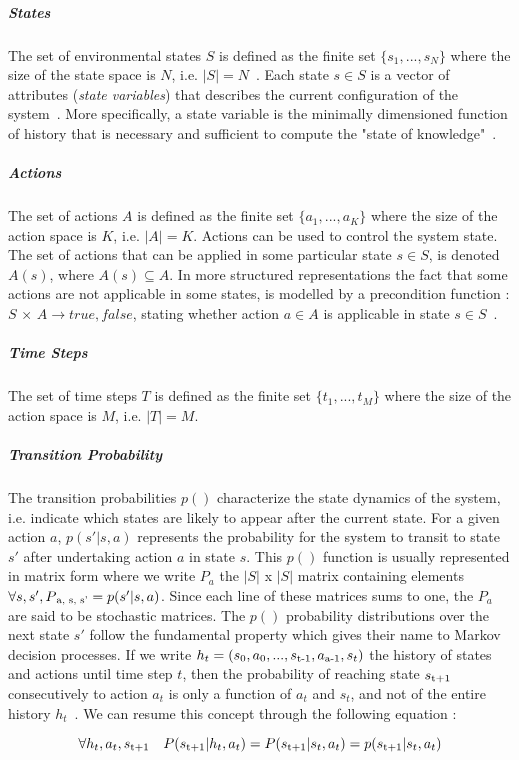 \subparagraph{States} The set of environmental states $S$ is defined as the finite set $\{s_1, . . . , s_N\}$ where the size of the state space is $N$, i.e. $|S| = N$~\cite{wiering2012reinforcement}. Each state ${s \in S}$ is a vector of attributes (\textit{state variables}) that describes the current configuration of the system~\cite{Nevmyvaka}. More specifically, a state variable is the minimally dimensioned function of history that is necessary and sufficient to compute the "state of knowledge"~\cite{Powell}.

\subparagraph{Actions} The set of actions $A$ is defined as the finite set $\{a_1, . . . ,a_K\}$ where the size of the action space is $K$, i.e. $|A| = K$. Actions can be used to control the system state. The set of actions that can be applied in some particular state $s \in S$, is denoted $A(s)$, where $A(s) \subseteq A$. In more structured representations the fact that some actions are not applicable in some states, is modelled by a precondition function : $S$ × $A→{true,false}$, stating whether action $a \in A$ is applicable in state $s \in S$~\cite{wiering2012reinforcement}.

\subparagraph{Time Steps} The set of time steps $T$ is defined as the finite set $\{t_1, . . . ,t_M\}$ where the size of the action space is $M$, i.e. $|T| = M$.

\subparagraph{Transition Probability} The transition probabilities $p()$ characterize the state dynamics of the system, i.e. indicate which states are likely to appear after the current state. For a given action $a$, $p(s'|s,a)$ represents the probability for the system to transit to state $s'$ after undertaking action $a$ in state $s$. This $p()$ function is usually represented in matrix form where we write $P_a$ the $|S|$ x $|S|$ matrix containing elements $\forall s, s', P\textsubscript{a, s, s'} = p(s'|s,a)$. Since each line of these matrices sums to one, the $P_a$ are said to be stochastic matrices. The $p()$ probability distributions over the next state $s'$ follow the fundamental property which gives their name to Markov decision processes. If we write $h_t = (s_0, a_0, ..., s\textsubscript{t-1}, a\textsubscript{a-1}, s_t)$ the history of states and actions until time step $t$, then the probability of reaching state $s\textsubscript{t+1}$ consecutively to action $a_t$ is only a function of $a_t$ and $s_t$, and not of the entire history $h_t$~\cite{Sigaud:2010:MDP:1841781}. We can resume this concept through the following equation :

\begin{equation}
	\forall h_t, a_t, s\textsubscript{t+1} \quad P(s\textsubscript{t+1} | h_t, a_t) = P(s\textsubscript{t+1} | s_t, a_t) = p(s\textsubscript{t+1} | s_t, a_t)
\end{equation}

